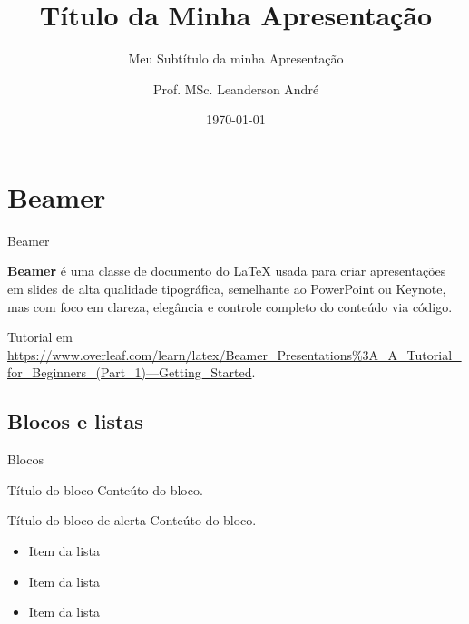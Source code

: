 \documentclass{beamer}
\title[Minha Apresentação no Rodapé]{Título da Minha Apresentação}
\subtitle{Meu Subtítulo da minha Apresentação}
\author[]{Prof. MSc. Leanderson André}
\institute[]{\inst{} Universidade da Região de Joinville }
\date{\today}
\begin{document}
\frame{\titlepage}

\section[Outline]{}



\section{Beamer}
\begin{frame}[fragile]{Beamer}

\textbf{Beamer} é uma classe de documento do LaTeX usada para criar apresentações em slides de alta qualidade tipográfica, semelhante ao PowerPoint ou Keynote, mas com foco em clareza, elegância e controle completo do conteúdo via código.



Tutorial em \url{https://www.overleaf.com/learn/latex/Beamer_Presentations%3A_A_Tutorial_for_Beginners_(Part_1)—Getting_Started}.

\end{frame}


\subsection{Blocos e listas}
\begin{frame}[fragile]{Blocos}

\begin{block}{Título do bloco}
Conteúto do bloco.

\end{block}



\begin{alertblock}{Título do bloco de alerta}
Conteúto do bloco.

\end{alertblock}

\begin{itemize}
\item Item da lista
\item Item da lista
\item Item da lista
\end{itemize}

\end{frame}
\end{document}
